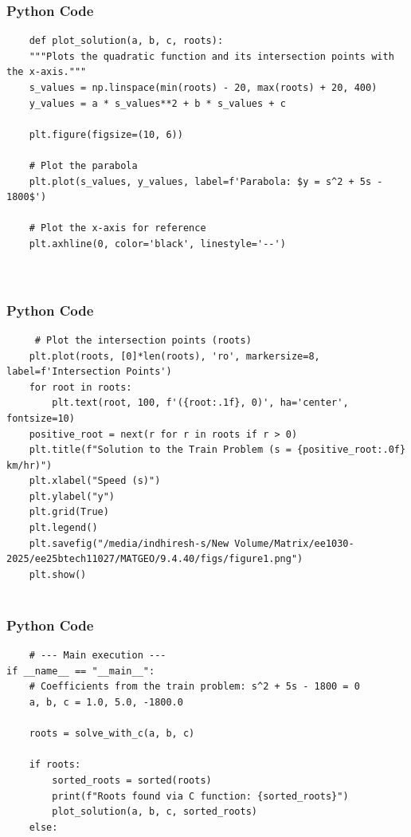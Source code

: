 \documentclass{beamer}
\begin{document}
    \begin{frame}[fragile]
        \frametitle{Python Code}
        \begin{lstlisting}
    def plot_solution(a, b, c, roots):
    """Plots the quadratic function and its intersection points with the x-axis."""
    s_values = np.linspace(min(roots) - 20, max(roots) + 20, 400)
    y_values = a * s_values**2 + b * s_values + c

    plt.figure(figsize=(10, 6))
    
    # Plot the parabola
    plt.plot(s_values, y_values, label=f'Parabola: $y = s^2 + 5s - 1800$')
    
    # Plot the x-axis for reference
    plt.axhline(0, color='black', linestyle='--')
    
  
        \end{lstlisting}
    \end{frame}
    
    \begin{frame}[fragile]
        \frametitle{Python Code}
        \begin{lstlisting}
     # Plot the intersection points (roots)
    plt.plot(roots, [0]*len(roots), 'ro', markersize=8, label=f'Intersection Points')
    for root in roots:
        plt.text(root, 100, f'({root:.1f}, 0)', ha='center', fontsize=10)
    positive_root = next(r for r in roots if r > 0)
    plt.title(f"Solution to the Train Problem (s = {positive_root:.0f} km/hr)")
    plt.xlabel("Speed (s)")
    plt.ylabel("y")
    plt.grid(True)
    plt.legend()
    plt.savefig("/media/indhiresh-s/New Volume/Matrix/ee1030-2025/ee25btech11027/MATGEO/9.4.40/figs/figure1.png")
    plt.show()


        \end{lstlisting}
    \end{frame}

    \begin{frame}[fragile]
        \frametitle{Python Code}
        \begin{lstlisting}
    # --- Main execution ---
if __name__ == "__main__":
    # Coefficients from the train problem: s^2 + 5s - 1800 = 0
    a, b, c = 1.0, 5.0, -1800.0
    
    roots = solve_with_c(a, b, c)

    if roots:
        sorted_roots = sorted(roots)
        print(f"Roots found via C function: {sorted_roots}")
        plot_solution(a, b, c, sorted_roots)
    else:
        \end{lstlisting}
    \end{frame}
    
\end{document}
